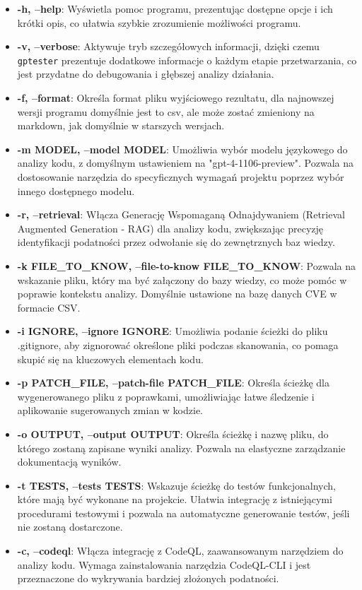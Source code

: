 \begin{itemize}
    \item \textbf{-h, --help}: Wyświetla pomoc programu, prezentując dostępne opcje i ich krótki opis, co ułatwia szybkie zrozumienie możliwości programu.
    \item \textbf{-v, --verbose}: Aktywuje tryb szczegółowych informacji, dzięki czemu \texttt{gptester} prezentuje dodatkowe informacje o każdym etapie przetwarzania, co jest przydatne do debugowania i głębszej analizy działania.
    \item \textbf{-f, --format}: Określa format pliku wyjściowego rezultatu, dla najnowszej wersji programu domyślnie jest to csv, ale może zostać zmieniony na markdown, jak domyślnie w starszych wersjach.
    \item \textbf{-m MODEL, --model MODEL}: Umożliwia wybór modelu językowego do analizy kodu, z domyślnym ustawieniem na "gpt-4-1106-preview". Pozwala na dostosowanie narzędzia do specyficznych wymagań projektu poprzez wybór innego dostępnego modelu.
    \item \textbf{-r, --retrieval}: Włącza Generację Wspomaganą Odnajdywaniem (Retrieval Augmented Generation - RAG) dla analizy kodu, zwiększając precyzję identyfikacji podatności przez odwołanie się do zewnętrznych baz wiedzy.
    \item \textbf{-k FILE\_TO\_KNOW, --file-to-know FILE\_TO\_KNOW}: Pozwala na wskazanie pliku, który ma być załączony do bazy wiedzy, co może pomóc w poprawie kontekstu analizy. Domyślnie ustawione na bazę danych CVE w formacie CSV.
    \item \textbf{-i IGNORE, --ignore IGNORE}: Umożliwia podanie ścieżki do pliku .gitignore, aby zignorować określone pliki podczas skanowania, co pomaga skupić się na kluczowych elementach kodu.
    \item \textbf{-p PATCH\_FILE, --patch-file PATCH\_FILE}: Określa ścieżkę dla wygenerowanego pliku z poprawkami, umożliwiając łatwe śledzenie i aplikowanie sugerowanych zmian w kodzie.
    \item \textbf{-o OUTPUT, --output OUTPUT}: Określa ścieżkę i nazwę pliku, do którego zostaną zapisane wyniki analizy. Pozwala na elastyczne zarządzanie dokumentacją wyników.
    \item \textbf{-t TESTS, --tests TESTS}: Wskazuje ścieżkę do testów funkcjonalnych, które mają być wykonane na projekcie. Ułatwia integrację z istniejącymi procedurami testowymi i pozwala na automatyczne generowanie testów, jeśli nie zostaną dostarczone.
    \item \textbf{-c, --codeql}: Włącza integrację z CodeQL, zaawansowanym narzędziem do analizy kodu. Wymaga zainstalowania narzędzia CodeQL-CLI i jest przeznaczone do wykrywania bardziej złożonych podatności.

\end{itemize}
